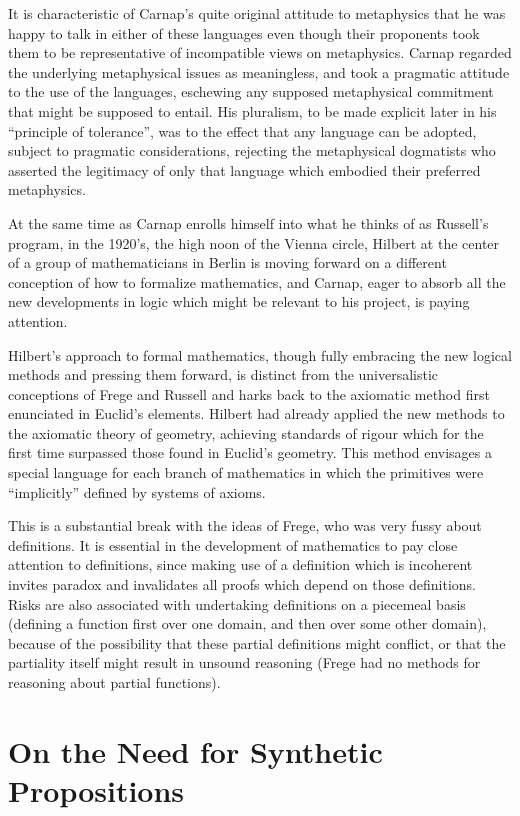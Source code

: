 It is characteristic of Carnap's quite original attitude to
metaphysics that he was happy to talk in either of these languages
even though their proponents took them to be representative of
incompatible views on metaphysics.
Carnap regarded the underlying metaphysical issues as meaningless, and
took a pragmatic attitude to the use of the languages, eschewing any
supposed metaphysical commitment that might be supposed to entail.
His pluralism, to be made explicit later in his ``principle of
tolerance'', was to the effect that any language can be adopted,
subject to pragmatic considerations, rejecting the metaphysical
dogmatists who asserted the legitimacy of only that language which
embodied their preferred metaphysics.

At the same time as Carnap enrolls himself into what he thinks of as
Russell's program, in the 1920's, the high noon of the Vienna
circle, Hilbert at the center of a group of mathematicians in Berlin
is moving forward on a different conception of how to formalize
mathematics, and Carnap, eager to absorb all the new developments in
logic which might be relevant to his project, is paying attention.

Hilbert's approach to formal mathematics, though fully embracing the
new logical methods and pressing them forward, is distinct from the
universalistic conceptions of Frege and Russell and harks back to the
axiomatic method first enunciated in Euclid's elements.
Hilbert had already applied the new methods to the axiomatic theory of
geometry, achieving standards of rigour which for the first time
surpassed those found in Euclid's geometry.
This method envisages a special language for each branch of
mathematics in which the primitives were ``implicitly'' defined by
systems of axioms.

This is a substantial break with the ideas of Frege, who was very
fussy about definitions.
It is essential in the development of mathematics to pay close
attention to definitions, since making use of a definition which is
incoherent invites paradox and invalidates all proofs which depend on
those definitions.
Risks are also associated with undertaking definitions on a piecemeal
basis (defining a function first over one domain, and then over some
other domain), because of the possibility that these partial
definitions might conflict, or that the partiality itself might result
in unsound reasoning (Frege had no methods for reasoning about partial functions).

\section{On the Need for Synthetic Propositions}

